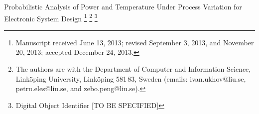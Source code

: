 {\TitleFont Probabilistic Analysis of Power and Temperature Under Process Variation for Electronic System Design}%
\thanks{Manuscript received June 13, 2013; revised September 3, 2013, and November 20, 2013; accepted December 24, 2013.}%
\thanks{The authors are with the Department of Computer and Information Science, Link\"{o}ping University, Link\"{o}ping 581\,83, Sweden (emails: ivan.ukhov@liu.se, petru.eles@liu.se, and zebo.peng@liu.se).}%
\thanks{Digital Object Identifier [TO BE SPECIFIED]}
